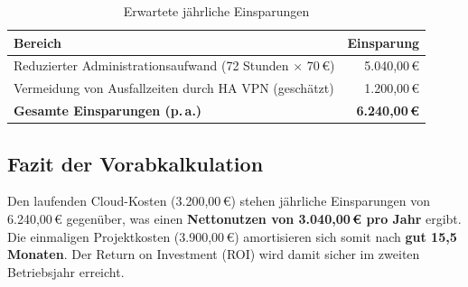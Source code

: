 \begin{table}[!ht]
\centering
\begin{tabularx}{\textwidth}{|X|r|}
\hline
\textbf{Bereich} & \textbf{Einsparung} \\ \hline
Reduzierter Administrationsaufwand (72 Stunden $\times$ 70\,€) & 5.040,00\,€ \\ \hline
Vermeidung von Ausfallzeiten durch HA VPN (geschätzt) & 1.200,00\,€ \\ \hline
\textbf{Gesamte Einsparungen (p.\,a.)} & \textbf{6.240,00\,€} \\ \hline
\end{tabularx}
\caption{Erwartete jährliche Einsparungen}
\end{table}

\subsection*{Fazit der Vorabkalkulation}
Den laufenden Cloud-Kosten (3.200,00\,€) stehen jährliche Einsparungen von 6.240,00\,€ gegenüber, was einen \textbf{Nettonutzen von 3.040,00\,€ pro Jahr} ergibt. Die einmaligen Projektkosten (3.900,00\,€) amortisieren sich somit nach \textbf{gut 15,5 Monaten}. Der Return on Investment (ROI) wird damit sicher im zweiten Betriebsjahr erreicht.